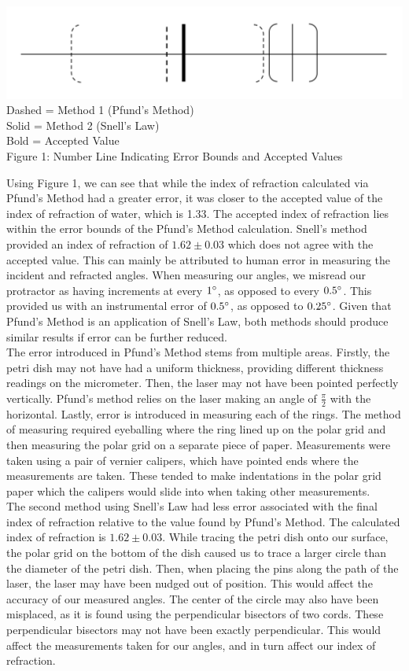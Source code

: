 \begin{center}
    \includegraphics[scale=0.5]{number line.png}\\
    Dashed = Method 1 (Pfund's Method)\\
    Solid = Method 2 (Snell's Law)\\
    Bold = Accepted Value \\
    Figure 1: Number Line Indicating Error Bounds and Accepted Values   
\end{center}
Using Figure 1, we can see that while the index of refraction calculated via Pfund's Method had a greater error, it was closer to the accepted value of the index of refraction of water, which is 1.33. The accepted index of refraction lies within the error bounds of the Pfund's Method calculation. Snell's method provided an index of refraction of $1.62\pm0.03$ which does not agree with the accepted value. This can mainly be attributed to human error in measuring the incident and refracted angles. When measuring our angles, we misread our protractor as having increments at every $1\degree$, as opposed to every $0.5\degree$. This provided us with an instrumental error of $0.5\degree$, as opposed to $0.25\degree$. Given that Pfund's Method is an application of Snell's Law, both methods should produce similar results if error can be further reduced.
\\\indent The error introduced in Pfund's Method stems from multiple areas. Firstly, the petri dish may not have had a uniform thickness, providing different thickness readings on the micrometer. Then, the laser may not have been pointed perfectly vertically. Pfund's method relies on the laser making an angle of $\frac{\pi}{2}$ with the horizontal. Lastly, error is introduced in measuring each of the rings. The method of measuring required eyeballing where the ring lined up on the polar grid and then measuring the polar grid on a separate piece of paper. Measurements were taken using a pair of vernier calipers, which have pointed ends where the measurements are taken. These tended to make indentations in the polar grid paper which the calipers would slide into when taking other measurements.\\
\indent The second method using Snell's Law had less error associated with the final index of refraction relative to the value found by Pfund's Method. The calculated index of refraction is $1.62\pm0.03$. While tracing the petri dish onto our surface, the polar grid on the bottom of the dish caused us to trace a larger circle than the diameter of the petri dish. Then, when placing the pins along the path of the laser, the laser may have been nudged out of position. This would affect the accuracy of our measured angles. The center of the circle may also have been misplaced, as it is found using the perpendicular bisectors of two cords. These perpendicular bisectors may not have been exactly perpendicular. This would affect the measurements taken for our angles, and in turn affect our index of refraction.
